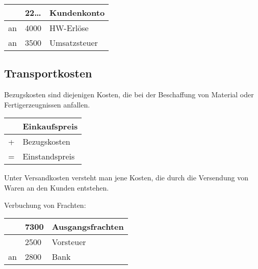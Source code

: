 \documentclass[letterpaper,10pt,english]{sphinxmanual}
\begin{document}


\begin{savenotes}\sphinxattablestart
\centering
\begin{tabulary}{\linewidth}[t]{|T|T|T|}
\hline
&
22…
&
Kundenkonto
\\
\hline
an
&
4000
&
HW-Erlöse
\\
\hline
an
&
3500
&
Umsatzsteuer
\\
\hline
\end{tabulary}
\par
\sphinxattableend\end{savenotes}


\subsection{Transportkosten}
\label{\detokenize{pool1:transportkosten}}

Bezugskosten sind diejenigen Kosten, die bei der Beschaffung von Material oder Fertigerzeugnissen anfallen.


\begin{savenotes}\sphinxattablestart
\centering
\begin{tabulary}{\linewidth}[t]{|T|T|}
\hline
&
Einkaufspreis
\\
\hline
+
&
Bezugskosten
\\
\hline
=
&
Einstandspreis
\\
\hline
\end{tabulary}
\par
\sphinxattableend\end{savenotes}


Unter Versandkosten versteht man jene Kosten, die durch die Versendung von Waren an den Kunden entstehen.

Verbuchung von Frachten:


\begin{savenotes}\sphinxattablestart
\centering
\begin{tabulary}{\linewidth}[t]{|T|T|T|}
\hline
&
7300
&
Ausgangsfrachten
\\
\hline&
2500
&
Vorsteuer
\\
\hline
an
&
2800
&
Bank
\\
\hline
\end{tabulary}
\par
\sphinxattableend\end{savenotes}
\end{document}
